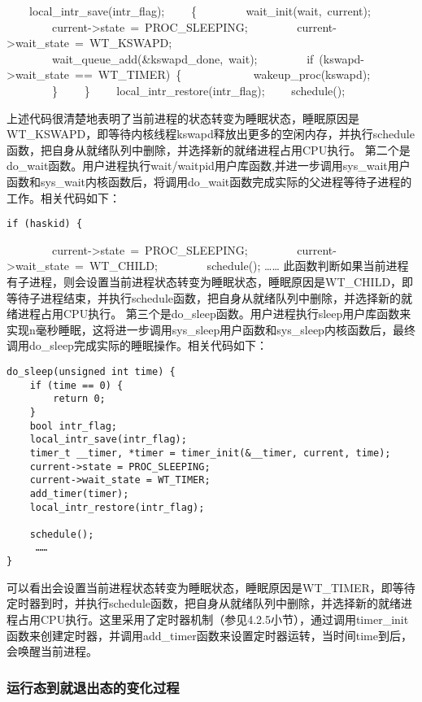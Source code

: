 ~~~~local\_intr\_save(intr\_flag); ~~~~\{
~~~~~~~~wait\_init(wait,~current);
~~~~~~~~current-\textgreater{}state~=~PROC\_SLEEPING;
~~~~~~~~current-\textgreater{}wait\_state~=~WT\_KSWAPD;
~~~~~~~~wait\_queue\_add(\&kswapd\_done,~wait);
~~~~~~~~if~(kswapd-\textgreater{}wait\_state~==~WT\_TIMER)~\{
~~~~~~~~~~~~wakeup\_proc(kswapd); ~~~~~~~~\} ~~~~\}
~~~~local\_intr\_restore(intr\_flag); ~~~~schedule();

上述代码很清楚地表明了当前进程的状态转变为睡眠状态，睡眠原因是WT\_KSWAPD，即等待内核线程kswapd释放出更多的空闲内存，并执行schedule函数，把自身从就绪队列中删除，并选择新的就绪进程占用CPU执行。
第二个是do\_wait函数。用户进程执行wait/waitpid用户库函数,并进一步调用sys\_wait用户函数和sys\_wait内核函数后，将调用do\_wait函数完成实际的父进程等待子进程的工作。相关代码如下：

\begin{lstlisting}
if (haskid) {
\end{lstlisting}

~~~~~~~~current-\textgreater{}state~=~PROC\_SLEEPING;
~~~~~~~~current-\textgreater{}wait\_state~=~WT\_CHILD;
~~~~~~~~schedule(); \ldots{}\ldots{}
此函数判断如果当前进程有子进程，则会设置当前进程状态转变为睡眠状态，睡眠原因是WT\_CHILD，即等待子进程结束，并执行schedule函数，把自身从就绪队列中删除，并选择新的就绪进程占用CPU执行。
第三个是do\_sleep函数。用户进程执行sleep用户库函数来实现n毫秒睡眠，这将进一步调用sys\_sleep用户函数和sys\_sleep内核函数后，最终调用do\_sleep完成实际的睡眠操作。相关代码如下：

\begin{lstlisting}
do_sleep(unsigned int time) {
    if (time == 0) {
        return 0;
    }
    bool intr_flag;
    local_intr_save(intr_flag);
    timer_t __timer, *timer = timer_init(&__timer, current, time);
    current->state = PROC_SLEEPING;
    current->wait_state = WT_TIMER;
    add_timer(timer);
    local_intr_restore(intr_flag);

    schedule();
     ……
}
\end{lstlisting}

可以看出会设置当前进程状态转变为睡眠状态，睡眠原因是WT\_TIMER，即等待定时器到时，并执行schedule函数，把自身从就绪队列中删除，并选择新的就绪进程占用CPU执行。这里采用了定时器机制（参见4.2.5小节），通过调用timer\_init函数来创建定时器，并调用add\_timer函数来设置定时器运转，当时间time到后，会唤醒当前进程。

\subsubsection{运行态到就退出态的变化过程}\label{ux8fd0ux884cux6001ux5230ux5c31ux9000ux51faux6001ux7684ux53d8ux5316ux8fc7ux7a0b}


